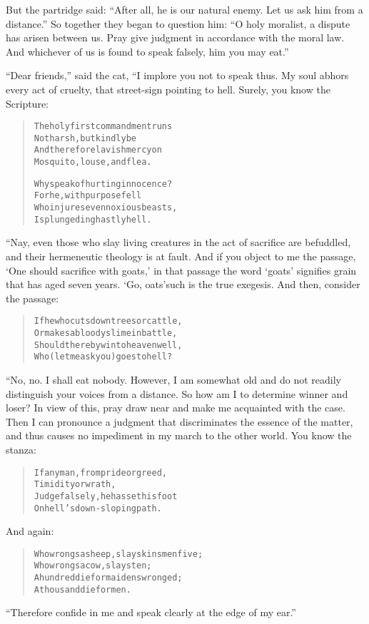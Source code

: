 \documentclass[article, twoside, 14pt]{memoir}
\renewenvironment{verbatim}{%
\begin{quote}%
\vskip -10pt%
\begin{alltt}\normalfont\large}{\end{alltt}%
\end{quote}%
\vskip -10pt
} %
\begin{document}
But the partridge said:
``After all, he is our natural enemy. Let us ask him from a distance.''
So together they began to question him:
``O holy moralist, a dispute has arisen between us. Pray give judgment in accordance with the moral law. And whichever of us is found to speak falsely, him you may eat.''

``Dear friends,'' said the cat, “I implore you not to speak thus.
My soul abhors every act of cruelty, that street-sign pointing to
hell. Surely, you know the Scripture:

\begin{verbatim}
The holy first commandment runs{\textemdash}
    Not harsh, but kindly be{\textemdash}
And therefore lavish mercy on
    Mosquito, louse, and flea.

Why speak of hurting innocence?
    For he, with purpose fell
Who injures even noxious beasts,
    Is plunged in ghastly hell.
\end{verbatim}
“Nay, even those who slay living creatures in the act of sacrifice
are befuddled, and their hermeneutic theology is at fault. And if
you object to me the passage, `One should sacrifice with goats,' in
that passage the word `goats' signifies grain that has aged seven
years. `Go, oats'{\textemdash}such is the true exegesis. And then, consider
the passage:

\begin{verbatim}
If he who cuts down trees or cattle,
Or makes a bloody slime in battle,
Should thereby win to heaven{\textemdash}well,
Who (let me ask you) goes to hell?
\end{verbatim}
“No, no. I shall eat nobody. However, I am somewhat old and do not
readily distinguish your voices from a distance. So how am I to
determine winner and loser? In view of this, pray draw near and
make me acquainted with the case. Then I can pronounce a judgment
that discriminates the essence of the matter, and thus causes no
impediment in my march to the other world. You know the stanza:

\begin{verbatim}
If any man, from pride or greed,
    Timidity or wrath,
Judge falsely, he has set his foot
    On hell's down-sloping path.
\end{verbatim}
And again:

\begin{verbatim}
Who wrongs a sheep, slays kinsmen five;
    Who wrongs a cow, slays ten;
A hundred die for maidens wronged;
    A thousand die for men.
\end{verbatim}
``Therefore confide in me and speak clearly at the edge of my ear.''
\end{document}
